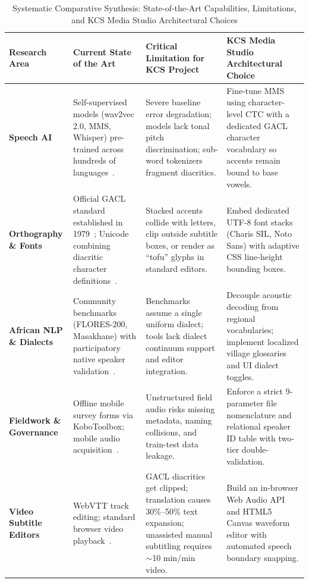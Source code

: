 \documentclass[conference]{IEEEtran}
\begin{document}
\begin{table}[t]
\centering
\small
\caption{Systematic Comparative Synthesis: State-of-the-Art Capabilities, Limitations, and KCS Media Studio Architectural Choices}
\label{tab:comparative_synthesis}
\begin{tabular}{>{\raggedright\arraybackslash}p{2.8cm} >{\raggedright\arraybackslash}p{4.2cm} >{\raggedright\arraybackslash}p{4.6cm} >{\raggedright\arraybackslash}p{4.8cm}}
\toprule
\textbf{Research Area} & \textbf{Current State of the Art} & \textbf{Critical Limitation for KCS Project} & \textbf{KCS Media Studio Architectural Choice} \\
\midrule
\textbf{Speech AI} & Self-supervised models (wav2vec 2.0, MMS, Whisper) pre-trained across hundreds of languages~\cite{conneau2023fleurs, radford2023robust}. & Severe baseline error degradation; models lack tonal pitch discrimination; sub-word tokenizers fragment diacritics. & Fine-tune MMS using character-level CTC with a dedicated GACL character vocabulary so accents remain bound to base vowels. \\
\addlinespace
\textbf{Orthography \& Fonts} & Official GACL standard established in 1979~\cite{tadadjeu1979alphabet}; Unicode combining diacritic character definitions~\cite{unicode2024standard}. & Stacked accents collide with letters, clip outside subtitle boxes, or render as ``tofu'' glyphs in standard editors. & Embed dedicated UTF-8 font stacks (Charis SIL, Noto Sans) with adaptive CSS line-height bounding boxes. \\
\addlinespace
\textbf{African NLP \& Dialects} & Community benchmarks (FLORES-200, Masakhane) with participatory native speaker validation~\cite{nekoto2020participatory, conneau2023fleurs}. & Benchmarks assume a single uniform dialect; tools lack dialect continuum support and editor integration. & Decouple acoustic decoding from regional vocabularies; implement localized village glossaries and UI dialect toggles. \\
\addlinespace
\textbf{Fieldwork \& Governance} & Offline mobile survey forms via KoboToolbox; mobile audio acquisition~\cite{kobotoolbox2024}. & Unstructured field audio risks missing metadata, naming collisions, and train-test data leakage. & Enforce a strict 9-parameter file nomenclature and relational speaker ID table with two-tier double-validation. \\
\addlinespace
\textbf{Video Subtitle Editors} & WebVTT track editing; standard browser video playback~\cite{w3c2019webvtt}. & GACL diacritics get clipped; translation causes 30\%--50\% text expansion; unassisted manual subtitling requires $\sim$10 min/min video. & Build an in-browser Web Audio API and HTML5 Canvas waveform editor with automated speech boundary snapping. \\

\end{tabular}
\end{table}
\end{document}
